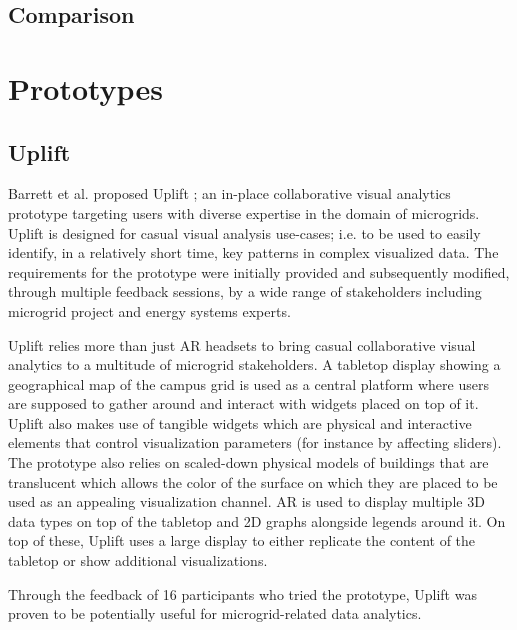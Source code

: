\documentclass{vgtc}                          %
\begin{document}
\subsection{Comparison}

\section{Prototypes}
\subsection{Uplift}
Barrett et al. proposed Uplift \cite{uplift_prototype}; an in-place
collaborative visual analytics prototype targeting users with diverse
expertise in the domain of microgrids. Uplift is designed for casual visual
analysis use-cases; i.e. to be used to easily identify, in a relatively short
time, key patterns in complex visualized data. The requirements for the
prototype were initially provided and subsequently modified, through multiple
feedback sessions, by a wide range of stakeholders including microgrid project
and energy systems experts.

\smallskip

\noindent Uplift relies more than just AR headsets to bring casual collaborative visual
analytics to a multitude of microgrid stakeholders. A tabletop display showing
a geographical map of the campus grid is used as a central platform where users
are supposed to gather around and interact with widgets placed on top of it.
Uplift also makes use of tangible
widgets which are physical and interactive elements that control visualization
parameters (for instance by affecting sliders). The prototype also relies on
scaled-down physical models of buildings that are translucent which allows
the color of the surface on which they are placed to be used as an appealing
visualization channel. AR is used to display multiple 3D data types on top of
the tabletop and 2D graphs alongside legends around it. On top of these, Uplift
uses a large display to either replicate the content of the tabletop or show
additional visualizations.

\smallskip

\noindent Through the feedback of 16 participants who tried the prototype, Uplift was
proven to be potentially useful for microgrid-related data analytics.

\smallskip
\end{document}
